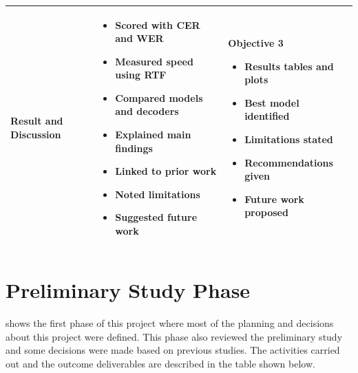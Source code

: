 \begin{table}[H]
{\begin{tabular}{ p{2.8cm}  p{5.3cm}  p{5.3cm}  }
\textbf{Result and Discussion} &
\begin{itemize}[leftmargin=*, nosep]
  \item Scored with CER and WER
  \item Measured speed using RTF
  \item Compared models and decoders
  \item Explained main findings
  \item Linked to prior work
  \item Noted limitations
  \item Suggested future work
\end{itemize}
&
Objective 3
\begin{itemize}[leftmargin=*, nosep]
  \item Results tables and plots
  \item Best model identified
  \item Limitations stated
  \item Recommendations given
  \item Future work proposed
\end{itemize}
\\ \hline

\end{tabular}}
\end{table}

\section{Preliminary Study Phase}
 shows the first phase of this project where most of the planning and decisions about this project were defined. This phase also reviewed the preliminary study and some decisions were made based on previous studies. The activities carried out and the outcome deliverables are described in the table shown below.
\vspace{1em}

